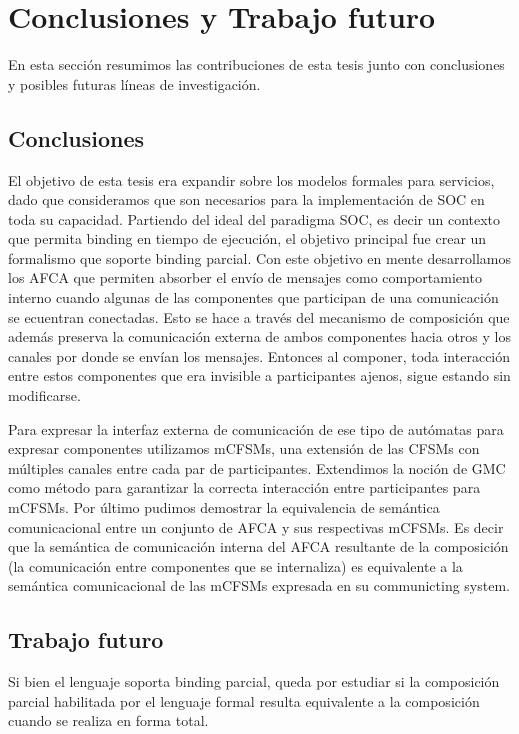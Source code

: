 \newpage
\chapter{Conclusiones y Trabajo futuro} 
\label{conclusiones}

En esta sección resumimos las contribuciones de esta tesis junto con conclusiones y posibles futuras líneas de investigación.


\section{Conclusiones} 

El objetivo de esta tesis era expandir sobre los modelos formales para servicios, dado que consideramos que son necesarios para la implementación de SOC en toda su capacidad. Partiendo del ideal del paradigma SOC, es decir un contexto que permita binding en tiempo de ejecución, el objetivo principal fue crear un formalismo que soporte binding parcial. Con este objetivo en mente desarrollamos los AFCA que permiten absorber el envío de mensajes como comportamiento interno cuando algunas de las componentes que participan de una comunicación se ecuentran conectadas. Esto se hace a través del mecanismo de composición que además preserva la comunicación externa de ambos componentes hacia otros y los canales por donde se envían los mensajes. Entonces al componer, toda interacción entre estos componentes que era invisible a participantes ajenos, sigue estando sin modificarse.

Para expresar la interfaz externa de comunicación de ese tipo de autómatas para expresar componentes utilizamos mCFSMs, una extensión de las CFSMs con múltiples canales entre cada par de participantes. Extendimos la noción de GMC como método para garantizar la correcta interacción entre participantes para mCFSMs. Por último pudimos demostrar la equivalencia de semántica comunicacional entre un conjunto de AFCA y sus respectivas mCFSMs. Es decir que la semántica de comunicación interna del AFCA resultante de la composición (la comunicación entre componentes que se internaliza) es equivalente a la semántica comunicacional de las mCFSMs expresada en su communicting system. 

\section{Trabajo futuro}

Si bien el lenguaje soporta binding parcial, queda por estudiar si la composición parcial habilitada por el lenguaje formal resulta equivalente a la composición cuando se realiza en forma total.

